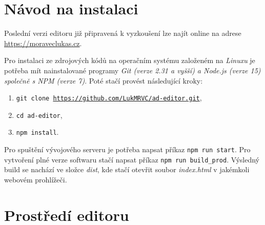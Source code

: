 \documentclass[czech,bachelor]{diploma}
\begin{document}
\MakeTitlePages









\printbibliography[title={Literatura}, heading=bibintoc]
\appendix
\chapter{Návod na instalaci}\label{chap:appendix-1}
Poslední verzi editoru již připravená k vyzkoušení lze najít online na adrese \href{https://moraveclukas.cz}{https://moraveclukas.cz}.

Pro instalaci ze zdrojových kódů na operačním systému založeném na \emph{Linuxu} je potřeba mít nainstalované programy 
\emph{Git (verze 2.31 a vyšší) a Node.js (verze 15) společně s NPM (verze 7)}.
Poté stačí provést následující kroky:
\begin{enumerate}
    \item \texttt{git clone \href{https://github.com/LukMRVC/ad-editor.git}{https://github.com/LukMRVC/ad-editor.git}},
    \item \texttt{cd ad-editor},
    \item \texttt{npm install}.
\end{enumerate}
Pro spuštění vývojového serveru je potřeba napsat příkaz \texttt{npm run start}.
Pro vytvoření plné verze softwaru stačí napsat příkaz \texttt{npm run build\_prod}. Výsledný build se nachází ve složce \emph{dist}, kde stačí
otevřit soubor \emph{index.html} v jakémkoli webovém prohlížeči.

% 
\chapter{Prostředí editoru}\label{chap:appendix-2}
\end{document}

